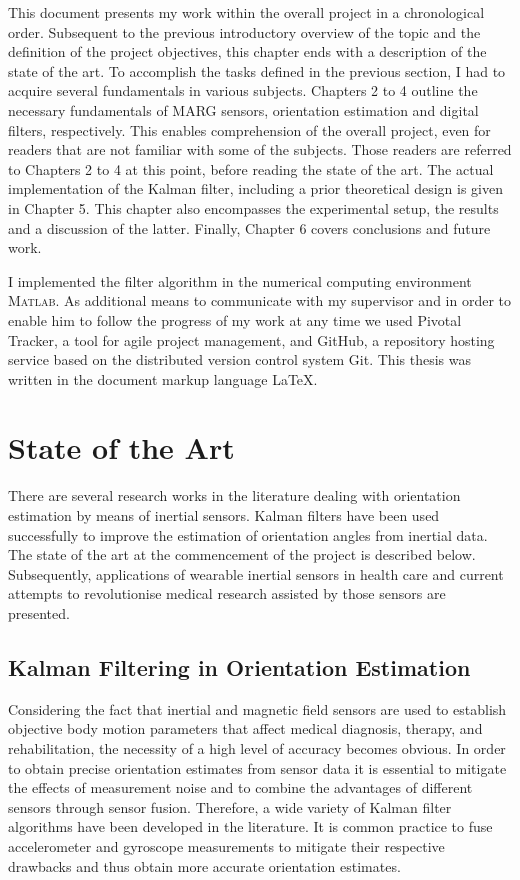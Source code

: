 This document presents my work within the overall project in a chronological order. Subsequent to the previous introductory overview of the topic and the definition of the project objectives, this chapter ends with a description of the state of the art. To accomplish the tasks defined in the previous section, I had to acquire several fundamentals in various subjects. Chapters 2 to 4 outline the necessary fundamentals of MARG sensors, orientation estimation and digital filters, respectively.  This enables comprehension of the overall project, even for readers that are not familiar with some of the subjects. Those readers are referred to Chapters 2 to 4 at this point, before reading the state of the art. The actual implementation of the Kalman filter, including a prior theoretical design is given in Chapter 5. This chapter also encompasses the experimental setup, the results and a discussion of the latter. Finally, Chapter 6 covers conclusions and future work.

I implemented the filter algorithm in the numerical computing environment \textsc{Matlab}\textsuperscript{\textregistered}. As additional means to communicate with my supervisor and in order to enable him to follow the progress of my work at any time we used Pivotal Tracker, a tool for agile project management, and GitHub, a repository hosting service based on the distributed version control system Git. This thesis was written in the document markup language \LaTeX{}.
 
\section{State of the Art}\label{sec:state_of_the_art}

There are several research works in the literature dealing with orientation estimation by means of inertial sensors. Kalman filters have been used successfully to improve the estimation of orientation angles from inertial data. The state of the art at the commencement of the project is described below. Subsequently, applications of wearable inertial sensors in health care and current attempts to revolutionise medical research assisted by those sensors are presented.

\subsection{Kalman Filtering in Orientation Estimation}

Considering the fact that inertial and magnetic field sensors are used to establish objective body motion parameters that affect medical diagnosis, therapy, and rehabilitation, the necessity of a high level of accuracy becomes obvious. In order to obtain precise orientation estimates from sensor data it is essential to mitigate the effects of measurement noise and to combine the advantages of different  sensors through sensor fusion. Therefore, a wide variety of Kalman filter algorithms have been developed in the literature. It is common practice to fuse accelerometer and gyroscope measurements to mitigate their respective drawbacks and thus obtain more accurate orientation estimates.

